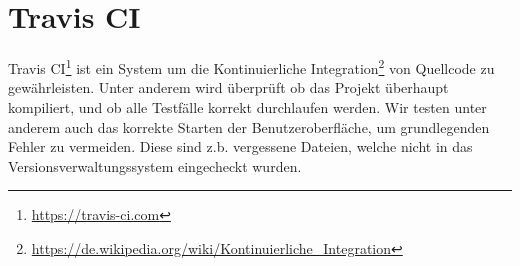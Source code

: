 

\section{Travis CI}

Travis CI\footnote{\url{https://travis-ci.com}} ist ein System um die Kontinuierliche Integration\footnote{\url{https://de.wikipedia.org/wiki/Kontinuierliche_Integration}} von Quellcode zu gew\"ahrleisten. Unter anderem wird \"uberpr\"uft ob das Projekt \"uberhaupt kompiliert, und ob alle Testf\"alle korrekt durchlaufen werden. Wir testen unter anderem auch das korrekte Starten der Benutzeroberfl\"ache, um grundlegenden Fehler zu vermeiden. Diese sind z.b. vergessene Dateien, welche nicht in das Versionsverwaltungssystem eingecheckt wurden.